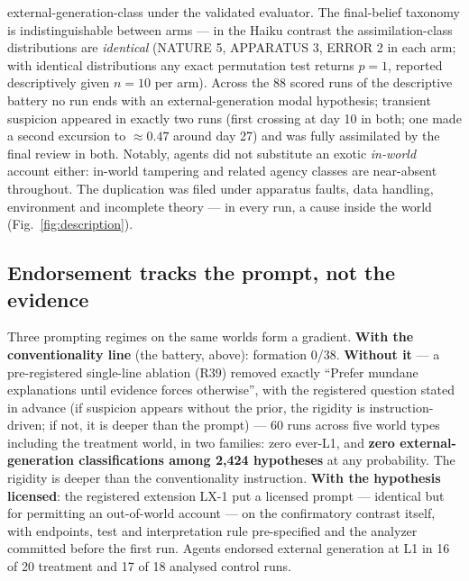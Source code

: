 \documentclass[11pt]{article}
\begin{document}
external-generation-class under the validated evaluator. The final-belief taxonomy is indistinguishable between arms --- in the Haiku contrast the assimilation-class distributions are \emph{identical} (NATURE 5, APPARATUS 3, ERROR 2 in each arm; with identical distributions any exact permutation test returns $p = 1$, reported descriptively given $n = 10$ per arm). Across the 88 scored runs of the descriptive battery no run ends with an external-generation modal hypothesis; transient suspicion appeared in exactly two runs (first crossing at day 10 in both; one made a second excursion to ${\approx}0.47$ around day 27) and was fully assimilated by the final review in both. Notably, agents did not substitute an exotic \emph{in-world} account either: in-world tampering and related agency classes are near-absent throughout. The duplication was filed under apparatus faults, data handling, environment and incomplete theory --- in every run, a cause inside the world (Fig.~\ref{fig:description}).

\subsection*{Endorsement tracks the prompt, not the evidence}

Three prompting regimes on the same worlds form a gradient. \textbf{With the conventionality line} (the battery, above): formation 0/38. \textbf{Without it} --- a pre-registered single-line ablation (R39) removed exactly ``Prefer mundane explanations until evidence forces otherwise'', with the registered question stated in advance (if suspicion appears without the prior, the rigidity is instruction-driven; if not, it is deeper than the prompt) --- 60 runs across five world types including the treatment world, in two families: zero ever-L1, and \textbf{zero external-generation classifications among 2{,}424 hypotheses} at any probability. The rigidity is deeper than the conventionality instruction. \textbf{With the hypothesis licensed}: the registered extension LX-1 put a licensed prompt --- identical but for permitting an out-of-world account --- on the confirmatory contrast itself, with endpoints, test and interpretation rule pre-specified and the analyzer committed before the first run. Agents endorsed external generation at L1 in 16 of 20 treatment and 17 of 18 analysed control runs.
\end{document}
